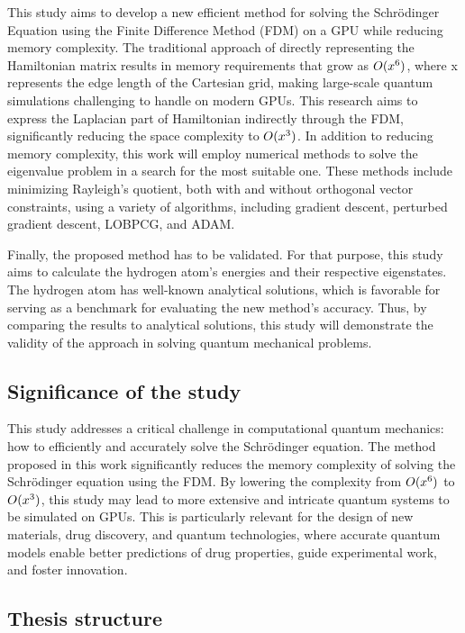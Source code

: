 This study aims to develop a new efficient method for solving the Schrödinger Equation using the Finite Difference Method (FDM) on a GPU while reducing memory complexity. The traditional approach of directly representing the Hamiltonian matrix results in memory requirements that grow as $O(x\textsuperscript{6})$, where x represents the edge length of the Cartesian grid, making large-scale quantum simulations challenging to handle on modern GPUs. This research aims to express the Laplacian part of Hamiltonian indirectly through the FDM, significantly reducing the space complexity to $O(x\textsuperscript{3})$.
In addition to reducing memory complexity, this work will employ numerical methods to solve the eigenvalue problem in a search for the most suitable one. These methods include minimizing Rayleigh's quotient, both with and without orthogonal vector constraints, using a variety of algorithms, including gradient descent, perturbed gradient descent, LOBPCG, and ADAM.

Finally, the proposed method has to be validated. For that purpose, this study aims to calculate the hydrogen atom's energies and their respective eigenstates. The hydrogen atom has well-known analytical solutions, which is favorable for serving as a benchmark for evaluating the new method's accuracy. Thus, by comparing the results to analytical solutions, this study will demonstrate the validity of the approach in solving quantum mechanical problems.

\subsection{Significance of the study}

This study addresses a critical challenge in computational quantum mechanics: how to efficiently and accurately solve the Schrödinger equation. The method proposed in this work significantly reduces the memory complexity of solving the Schrödinger equation using the FDM. By lowering the complexity from $O(x\textsuperscript{6})$ to $O(x\textsuperscript{3})$, this study may lead to more extensive and intricate quantum systems to be simulated on GPUs. This is particularly relevant for the design of new materials, drug discovery, and quantum technologies, where accurate quantum models enable better predictions of drug properties, guide experimental work, and foster innovation.

\subsection{Thesis structure}
